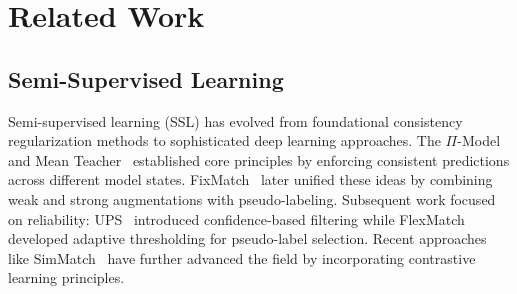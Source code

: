 \section{Related Work}
\label{sec:related}

\subsection{Semi-Supervised Learning}

Semi-supervised learning (SSL) has evolved from foundational consistency regularization methods to sophisticated deep learning approaches. The $\Pi$-Model~\cite{laine2022temporal} and Mean Teacher~\cite{tarvainen2017mean} established core principles by enforcing consistent predictions across different model states. FixMatch~\cite{sohn2020fixmatch} later unified these ideas by combining weak and strong augmentations with pseudo-labeling. Subsequent work focused on reliability: UPS~\cite{rizvedefense} introduced confidence-based filtering while FlexMatch~\cite{zhang2021flexmatch} developed adaptive thresholding for pseudo-label selection. Recent approaches like SimMatch~\cite{zheng2022simmatch} have further advanced the field by incorporating contrastive learning principles.



